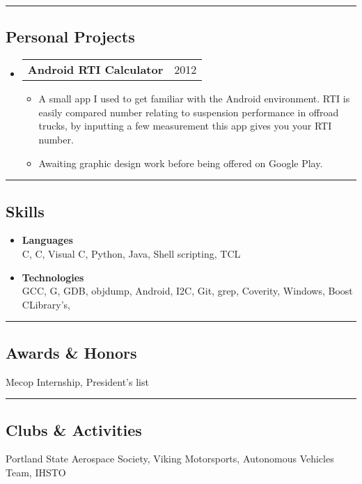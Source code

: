 \documentclass[10pt,letterpaper]{article}
\makeatletter
\newcommand{\CPP}
{C\nolinebreak[4]\hspace{-.05em}\raisebox{.22ex}{\footnotesize\bf ++}}
\newcommand{\GPP}
{G\nolinebreak[4]\hspace{-.05em}\raisebox{.22ex}{\footnotesize\bf ++}}
\newcommand{\heading}[2]
{\begin{tabular*}{\linewidth}{l@{\extracolsep{\fill}}r}
#1 &
#2 \\
\end{tabular*}}
\makeatother
\begin{document}
\hrule

\subsection*{Personal Projects}
	\begin{itemize}
		\item 
			\heading
				{\textbf{Android RTI Calculator}}
				{2012}
			\vspace{-2em}
			\begin{itemize}
				\item A small app I used to get familiar with the Android environment. RTI is easily compared number relating to suspension performance in offroad trucks, by inputting a few  measurement this app gives you your RTI number.
				\item Awaiting graphic design work before being offered on Google Play.
			\end{itemize}
	\end{itemize}

\hrule

\subsection*{Skills}
	\begin{itemize}
		\item 
		\textbf{Languages}\\
		 C, \CPP, Visual \CPP,  Python, Java, Shell scripting, TCL
		\item
		\textbf{Technologies}\\
		GCC, \GPP{}, GDB, objdump, Android, I2C, Git, grep, Coverity, Windows, Boost \CPP Library's, 
	\end{itemize}

\hrule

\subsection*{Awards \& Honors}
			Mecop Internship, President's list\\

\hrule

\subsection*{Clubs \& Activities}
			Portland State Aerospace Society, Viking Motorsports, Autonomous Vehicles Team, IHSTO\\
\end{document}
